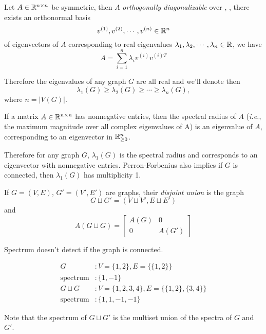 \begin{theorem}
Let \(A\in\mathbb{R}^{n\times n}\) be symmetric, then \(A\) \emph{orthogonally diagonalizable} over \R, ,
there exists an orthonormal basis
\[ v^{(1)}, v^{(2)},\cdots,v^{(n)}\in\mathbb{R}^n \]
of eigenvectors of \(A\) corresponding to real eigenvalues \(\lambda_1,\lambda_2,\cdots,\lambda_n\in\mathbb{R}\), we have
\[A=\sum_{i=1}^{n}\lambda_i v^{(i)}v^{(i)T} \]
\end{theorem}

Therefore the eigenvalues of any graph \(G\) are all real and we'll denote then
\[ \lambda_1(G)\geq\lambda_2(G)\geq\cdots\geq\lambda_n(G), \]
where \(n=|V(G)|\).

\begin{theorem}
If a matrix \(A\in\mathbb{R}^{n\times n}\) has nonnegative entries, then the spectral radius of \(A\) (\textit{i.e.}, the maximum magnitude over all complex eigenvalues of A) is an eigenvalue of \(A\), corresponding to an eigenvector in \(\mathbb{R}_{\ge0}^n\).
\end{theorem}
Therefore for any graph \(G\), \(\lambda_1(G)\) is the spectral radius and corresponds to an eigenvector with nonnegative entries.
Perron-Forbenius also implies if \(G\) is connected, then \(\lambda_1(G)\) has multiplicity 1.


\begin{definition}
If \(G=(V,E)\), \(G'=(V',E')\) are graphs, their \emph{disjoint union} is the graph
\[ G\sqcup G'=(V\sqcup V', E\sqcup E') \]
and
\[ A(G\sqcup G)=\begin{bmatrix} A(G) & 0 \\ 0 & A(G') \end{bmatrix} \]
\end{definition}
\begin{remark}
Spectrum doesn't detect if the graph is connected.
\end{remark}
\begin{example}
\begin{align*}
G&: V=\{1,2\}, E=\{\{1,2\}\}\\
\text{spectrum}&: \{1,-1\}\\
G\sqcup G&: V=\{1,2,3,4\}, E=\{\{1,2\},\{3,4\}\}\\
\text{spectrum}&: \{1,1,-1,-1\}
\end{align*}
\end{example}

\begin{remark}
Note that the spectrum of \(G\sqcup G'\) is the multiset union of the spectra of \(G\) and \(G'\).
\end{remark}


